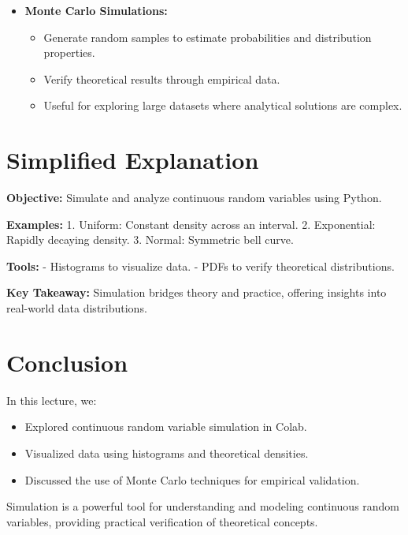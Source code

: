 \documentclass{article}
\begin{document}
\begin{itemize}
  \item \textbf{Monte Carlo Simulations:}
    \begin{itemize}
      \item Generate random samples to estimate probabilities and distribution properties.
      \item Verify theoretical results through empirical data.
      \item Useful for exploring large datasets where analytical solutions are complex.
    \end{itemize}
\end{itemize}

\section*{Simplified Explanation}

\textbf{Objective:} Simulate and analyze continuous random variables using Python.

\textbf{Examples:}
1. Uniform: Constant density across an interval.
2. Exponential: Rapidly decaying density.
3. Normal: Symmetric bell curve.

\textbf{Tools:}
- Histograms to visualize data.
- PDFs to verify theoretical distributions.

\textbf{Key Takeaway:} Simulation bridges theory and practice, offering insights into real-world data distributions.

\section*{Conclusion}

In this lecture, we:
\begin{itemize}
  \item Explored continuous random variable simulation in Colab.
  \item Visualized data using histograms and theoretical densities.
  \item Discussed the use of Monte Carlo techniques for empirical validation.
\end{itemize}

Simulation is a powerful tool for understanding and modeling continuous random variables, providing practical verification of theoretical concepts.
\end{document}
